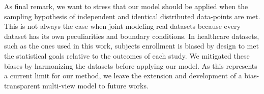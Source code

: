 As final remark, we want to stress that our model should be applied when the sampling hypothesis of independent and identical distributed data-points are met.
This is not always the case when joint modeling real datasets because every dataset has its own peculiarities and boundary conditions.
In healthcare datasets, such as the ones used in this work, subjects enrollment is biased by design to met the statistical goals relative to the outcomes of each study.
We mitigated these biases by harmonizing the datasets before applying our model.
As this represents a current limit for our method, we leave the extension and development of a bias-transparent multi-view model to future works.

